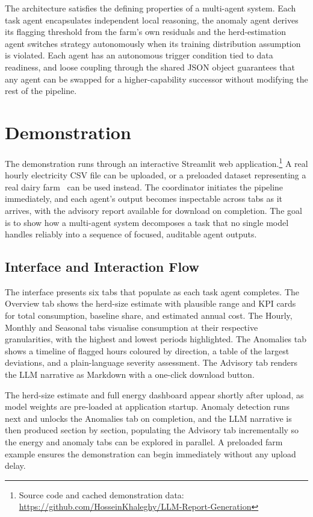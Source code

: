 \documentclass[runningheads]{llncs}
\begin{document}
The architecture satisfies the defining properties of a multi-agent system.
Each task agent encapsulates independent local reasoning, the anomaly agent
derives its flagging threshold from the farm's own residuals and the
herd-estimation agent switches strategy autonomously when its training
distribution assumption is violated. Each agent has an autonomous trigger
condition tied to data readiness, and loose coupling through the shared JSON
object guarantees that any agent can be swapped for a higher-capability
successor without modifying the rest of the pipeline.

\section{Demonstration}
\label{sec:demo}

The demonstration runs through an interactive Streamlit web
application.\footnote{Source code and cached demonstration data:
\url{https://github.com/HosseinKhaleghy/LLM-Report-Generation}}
A real hourly electricity CSV file can be uploaded, or a preloaded dataset
representing a real dairy farm~\cite{dairydataset} can be used instead. The coordinator
initiates the pipeline immediately, and each agent's output becomes
inspectable across tabs as it arrives, with the advisory report available
for download on completion. The goal is to show how a multi-agent system decomposes
a task that no single model handles reliably into a sequence of focused,
auditable agent outputs.

\subsection{Interface and Interaction Flow}

The interface presents six tabs that populate as each task agent completes.
The Overview tab shows the herd-size estimate with plausible range and KPI
cards for total consumption, baseline share, and estimated annual cost. The
Hourly, Monthly and Seasonal tabs visualise consumption at their respective
granularities, with the highest and lowest periods highlighted. The Anomalies
tab shows a timeline of flagged hours coloured by direction, a table of the
largest deviations, and a plain-language severity assessment. The Advisory
tab renders the LLM narrative as Markdown with a one-click download button.

The herd-size estimate and full energy dashboard appear shortly after upload,
as model weights are pre-loaded at application startup. Anomaly detection
runs next and unlocks the Anomalies tab on completion, and the LLM narrative
is then produced section by section, populating the Advisory tab
incrementally so the energy and anomaly tabs can be explored in parallel. A
preloaded farm example ensures the demonstration can begin immediately
without any upload delay.
\end{document}

